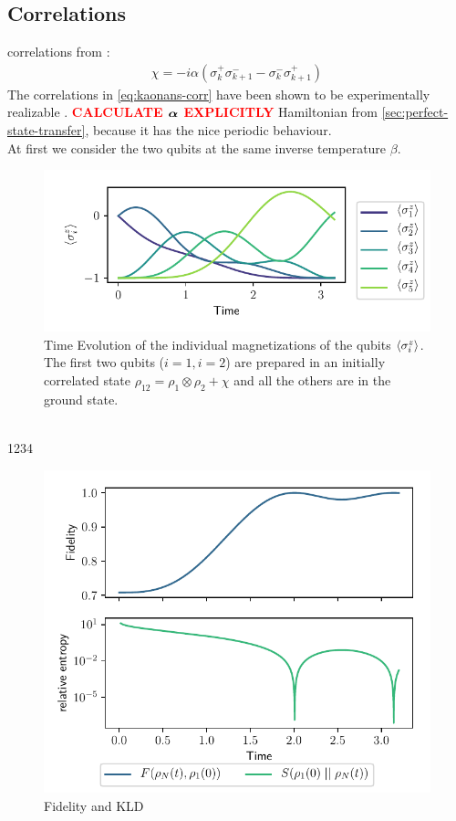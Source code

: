\documentclass{book}
\numberwithin{equation}{section} %
\begin{document}
\subsection{Correlations}\label{sec:therm-corr}
correlations from \cite{BA_kaonan_correlations}:
\begin{align}\label{eq:kaonans-corr}
    \chi = -i\alpha(\sigma^+_k \sigma^-_{k+1} - \sigma^-_k \sigma^+_{k+1})
\end{align}
The correlations in \cref{eq:kaonans-corr} have been shown to be experimentally realizable \cite{BA_kaonan_correlations}.
\textcolor{red}{\textbf{CALCULATE $\vb*{\alpha}$ EXPLICITLY}}
Hamiltonian from \cref{sec:perfect-state-transfer}, because it has the nice periodic behaviour.\\
At first we consider the two qubits at the same inverse temperature $\beta$.
\begin{figure}[h!]
    \centering
    \includegraphics{alltheplots/corr_at_diff_pos-new-alpha/12_expval_z.pdf}
    \caption{Time Evolution of the individual magnetizations of the qubits
    $\expval{\sigma^z_i}$.
    The first two qubits ($i=1, i=2$) are prepared in an initially correlated state $\rho_{12} = \rho_1 \otimes \rho_2 + \chi$
    and all the others are in the ground state.}
    \label{fig:corr12_expval_z}
\end{figure}\\
1234
\begin{figure}[h!]
    \centering
    \includegraphics{alltheplots/corr_at_diff_pos-new-alpha/12_fidelity_kld.pdf}
    \caption{Fidelity and KLD}
    \label{fig:corr12_fid_kld}
\end{figure}\\
\end{document}

